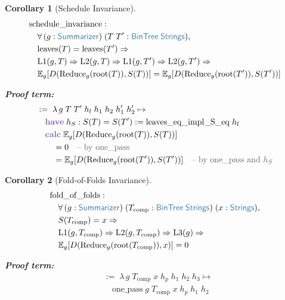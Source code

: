 \documentclass[11pt]{article}
\theoremstyle{definition}
\theoremstyle{plain}
\newtheorem{corenv}{Corollary}
\newcommand{\kw}[1]{\textcolor{keyword}{\textbf{#1}}}
\newcommand{\ty}[1]{\textcolor{type}{\mathsf{#1}}}
\newcommand{\fn}[1]{\mathrm{#1}}
\newcommand{\cmt}[1]{\textcolor{comment}{\text{-- #1}}}
\newcommand{\lam}{\lambda\,}
\newcommand{\all}{\forall\,}
\newcommand{\Arr}{\Rightarrow}
\newcommand{\pf}{:=\;}
\newcommand{\Strings}{\ty{Strings}}
\newcommand{\Eg}{\mathbb{E}_g}
\newcommand{\reduce}{\fn{Reduce}_g}
\begin{document}
\begin{corenv}[Schedule Invariance]
\label{cor:schedule}
\begin{align*}
&\fn{schedule\_invariance} : \\
&\quad \all (g : \ty{Summarizer})\; (T\; T' : \ty{BinTree}\;\Strings), \\
&\quad \fn{leaves}(T) = \fn{leaves}(T') \Arr \\
&\quad \fn{L1}(g, T) \Arr \fn{L2}(g, T) \Arr \fn{L1}(g, T') \Arr \fn{L2}(g, T') \Arr \\
&\quad \Eg[D(\reduce(\fn{root}(T)), S(T))] = \Eg[D(\reduce(\fn{root}(T')), S(T'))]
\end{align*}

\textbf{Proof term:}
\begin{align*}
&\pf \lam g\; T\; T'\; h_l\; h_1\; h_2\; h_1'\; h_2' \mapsto \\
&\quad \kw{have}\; h_S : S(T) = S(T') := \fn{leaves\_eq\_impl\_S\_eq}\; h_l \\
&\quad \kw{calc}\; \Eg[D(\reduce(\fn{root}(T)), S(T))] \\
&\quad\quad = 0 \quad\cmt{by $\fn{one\_pass}$} \\
&\quad\quad = \Eg[D(\reduce(\fn{root}(T')), S(T'))] \quad\cmt{by $\fn{one\_pass}$ and $h_S$}
\end{align*}
\end{corenv}

\begin{corenv}[Fold-of-Folds Invariance]
\label{cor:folds}
\begin{align*}
&\fn{fold\_of\_folds} : \\
&\quad \all (g : \ty{Summarizer})\; (T_{\text{comp}} : \ty{BinTree}\;\Strings)\; (x : \Strings), \\
&\quad S(T_{\text{comp}}) = x \Arr \\
&\quad \fn{L1}(g, T_{\text{comp}}) \Arr \fn{L2}(g, T_{\text{comp}}) \Arr \fn{L3}(g) \Arr \\
&\quad \Eg[D(\reduce(\fn{root}(T_{\text{comp}})), x)] = 0
\end{align*}

\textbf{Proof term:}
\begin{align*}
&\pf \lam g\; T_{\text{comp}}\; x\; h_p\; h_1\; h_2\; h_3 \mapsto \\
&\quad \fn{one\_pass}\; g\; T_{\text{comp}}\; x\; h_p\; h_1\; h_2
\end{align*}
\end{corenv}
\end{document}
